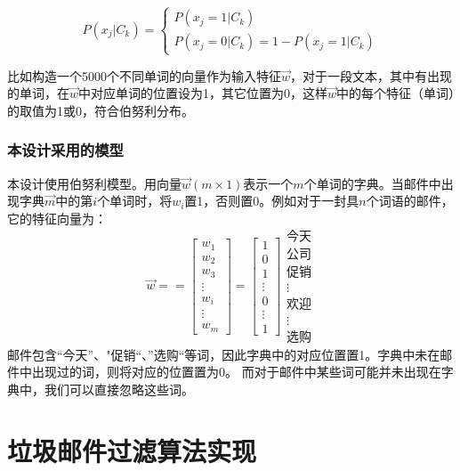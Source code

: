 \documentclass[UTF8,zihao=-4]{ctexart}
\begin{document}
	\begin{equation}
P\left(x_{j} | C_{k}\right)=\left\{\begin{array}{l}{P\left(x_{j}=1 | C_{k}\right)} \\ {P\left(x_{j}=0 | C_{k}\right)=1-P\left(x_{j}=1 | C_{k}\right)}\end{array}\right.
	\end{equation}

比如构造一个5000个不同单词的向量作为输入特征$\vec{w}$，对于一段文本，其中有出现的单词，在$\vec{w}$中对应单词的位置设为1，其它位置为0，这样$\vec{w}$中的每个特征（单词）的取值为1或0，符合伯努利分布。
\subsubsection{本设计采用的模型}
	本设计使用伯努利模型。用向量$\vec{w}(m \times 1)$表示一个$m$个单词的字典。当邮件中出现字典$\vec{m}$中的第$i$个单词时，将$w_i$置1，否则置0。例如对于一封具$n$个词语的邮件，它的特征向量为：
	$$
	\vec{w}=
	=
	\begin{bmatrix}
	w_1\\
	w_2\\
	w_3\\
	\vdots\\
	w_i\\
	\vdots\\
	w_m
	\end{bmatrix}
	=
	\begin{bmatrix}
	1\\
	0\\
	1\\
	\vdots\\
	0\\
	\vdots\\
	1
	\end{bmatrix}
	\begin{matrix}
	\text{今天}\\
	\text{公司}\\
	\text{促销}\\
	\vdots\\
	\text{欢迎}\\
	\vdots\\
	\text{选购}
	\end{matrix}
	$$
	邮件包含“今天”、"促销“、”选购“等词，因此字典中的对应位置置1。字典中未在邮件中出现过的词，则将对应的位置置为0。 而对于邮件中某些词可能并未出现在字典中，我们可以直接忽略这些词。
	

\newpage
\section{垃圾邮件过滤算法实现}
\end{document}
